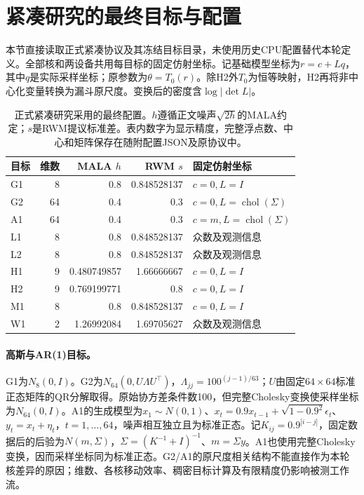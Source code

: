 \section{紧凑研究的最终目标与配置}
\label{sec:compact-final-config}
本节直接读取正式紧凑协议及其冻结目标目录，未使用历史CPU配置替代本轮定义。全部核和两设备共用每目标的固定仿射坐标。记基础模型坐标为$r=c+Lq$，其中$q$是实际采样坐标；原参数为$\theta=T_0(r)$。除H2外$T_0$为恒等映射，H2再将非中心化变量转换为漏斗原尺度。变换后的密度含$\log|\det L|$。

\begin{table}[htbp]\centering\small
\begin{tabular}{lrrrl}\toprule
目标 & 维数 & MALA $h$ & RWM $s$ & 固定仿射坐标\\\midrule
G1 & 8 & 0.8 & 0.848528137 & $c=0,L=I$\\
G2 & 64 & 0.4 & 0.3 & $c=0,L=\operatorname{chol}(\Sigma)$\\
A1 & 64 & 0.4 & 0.3 & $c=m,L=\operatorname{chol}(\Sigma)$\\
L1 & 8 & 0.8 & 0.848528137 & 众数及观测信息\\
L2 & 8 & 0.8 & 0.848528137 & 众数及观测信息\\
H1 & 9 & 0.480749857 & 1.66666667 & $c=0,L=I$\\
H2 & 9 & 0.769199771 & 0.8 & $c=0,L=I$\\
M1 & 8 & 0.8 & 0.848528137 & $c=0,L=I$\\
W1 & 2 & 1.26992084 & 1.69705627 & 众数及观测信息\\
\bottomrule\end{tabular}
\caption{正式紧凑研究采用的最终配置。$h$遵循正文噪声$\sqrt{2h}$的MALA约定；$s$是RWM提议标准差。表内数字为显示精度，完整浮点数、中心和矩阵保存在随附配置JSON及原协议中。}
\label{tab:compact-final-steps}\end{table}

\paragraph{高斯与AR(1)目标。}
G1为$N_8(0,I)$。G2为$N_{64}(0,U\Lambda U^\top)$，$\Lambda_{jj}=100^{(j-1)/63}$；$U$由固定$64\times64$标准正态矩阵的QR分解取得。原始协方差条件数100，但完整Cholesky变换使采样坐标为$N_{64}(0,I)$。A1的生成模型为$x_1\sim N(0,1)$、$x_t=0.9x_{t-1}+\sqrt{1-0.9^2}\epsilon_t$、$y_t=x_t+\eta_t$，$t=1,\ldots,64$，噪声相互独立且为标准正态。记$K_{ij}=0.9^{|i-j|}$，固定数据后的后验为$N(m,\Sigma)$，$\Sigma=(K^{-1}+I)^{-1}$、$m=\Sigma y$。A1也使用完整Cholesky变换，因而采样坐标同为标准正态。G2/A1的原尺度相关结构不能直接作为本轮核差异的原因；维数、各核移动效率、稠密目标计算及有限精度仍影响被测工作流。

